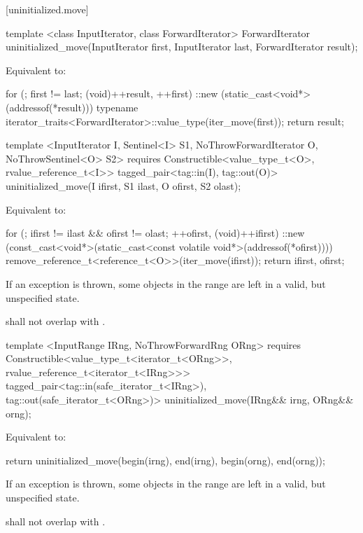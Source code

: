 [uninitialized.move]{}
{\color{remclr}
\begin{codeblock}
template <class InputIterator, class ForwardIterator>
  ForwardIterator uninitialized_move(InputIterator first, InputIterator last,
                                     ForwardIterator result);
\end{codeblock}

\setcounter{Paras}{0}
\pnum
\effects Equivalent to:
\begin{codeblock}
    for (; first != last; (void)++result, ++first)
      ::new (static_cast<void*>(addressof(*result)))
        typename iterator_traits<ForwardIterator>::value_type(iter_move(first));
    return result;
\end{codeblock}
} %
{\color{addclr}
\begin{codeblock}
template <InputIterator I, Sentinel<I> S1, NoThrowForwardIterator O, NoThrowSentinel<O> S2>
  requires
Constructible<value_type_t<O>, rvalue_reference_t<I>>
  tagged_pair<tag::in(I), tag::out(O)>
uninitialized_move(I ifirst, S1 ilast, O ofirst, S2 olast);
\end{codeblock}

\setcounter{Paras}{0}
\pnum
\effects Equivalent to:
\begin{codeblock}
    for (; ifirst != ilast && ofirst != olast; ++ofirst, (void)++ifirst) {
      ::new (const_cast<void*>(static_cast<const volatile void*>(addressof(*ofirst))))
        remove_reference_t<reference_t<O>>(iter_move(ifirst));
    }
    return {ifirst, ofirst};
\end{codeblock}
} %

\pnum
\remarks If an exception is thrown, some objects in the range  are left in a
valid, but unspecified state.

{\color{addclr}
\pnum
\requires {} shall not overlap with .

\begin{codeblock}
template <InputRange IRng, NoThrowForwardRng ORng>
  requires
Constructible<value_type_t<iterator_t<ORng>>, rvalue_reference_t<iterator_t<IRng>>>
  tagged_pair<tag::in(safe_iterator_t<IRng>), tag::out(safe_iterator_t<ORng>)>
uninitialized_move(IRng&& irng, ORng&& orng);
\end{codeblock}

\pnum
\effects Equivalent to:
\begin{codeblock}
    return uninitialized_move(begin(irng), end(irng), begin(orng), end(orng));
\end{codeblock}

\pnum
\remarks If an exception is thrown, some objects in the range  are left
in a valid, but unspecified state.

\pnum
\requires {} shall not overlap with .
} %

